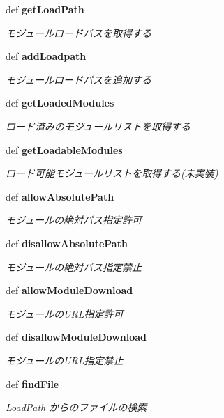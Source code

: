 \begin{CompactItemize}
def {\bf getLoadPath}
\begin{CompactList}\small\item\em モジュールロードパスを取得する \item\end{CompactList}\item 
def {\bf addLoadpath}
\begin{CompactList}\small\item\em モジュールロードパスを追加する \item\end{CompactList}\item 
def {\bf getLoadedModules}
\begin{CompactList}\small\item\em ロード済みのモジュールリストを取得する \item\end{CompactList}\item 
def {\bf getLoadableModules}
\begin{CompactList}\small\item\em ロード可能モジュールリストを取得する(未実装) \item\end{CompactList}\item 
def {\bf allowAbsolutePath}
\begin{CompactList}\small\item\em モジュールの絶対パス指定許可 \item\end{CompactList}\item 
def {\bf disallowAbsolutePath}
\begin{CompactList}\small\item\em モジュールの絶対パス指定禁止 \item\end{CompactList}\item 
def {\bf allowModuleDownload}
\begin{CompactList}\small\item\em モジュールのURL指定許可 \item\end{CompactList}\item 
def {\bf disallowModuleDownload}
\begin{CompactList}\small\item\em モジュールのURL指定禁止 \item\end{CompactList}\item 
def {\bf findFile}
\begin{CompactList}\small\item\em LoadPath からのファイルの検索 \item\end{CompactList}\item 

\end{CompactItemize}
